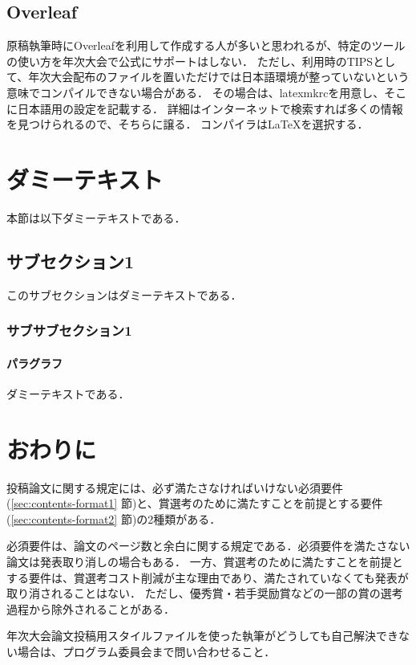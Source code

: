 \documentclass[
  platex, dvipdfmx,  %
]{nlp2021}
\begin{document}
\subsection{Overleaf}
原稿執筆時にOverleafを利用して作成する人が多いと思われるが、特定のツールの使い方を年次大会で公式にサポートはしない．
ただし、利用時のTIPSとして、年次大会配布のファイルを置いただけでは日本語環境が整っていないという意味でコンパイルできない場合がある．
その場合は、latexmkrcを用意し、そこに日本語用の設定を記載する．
詳細はインターネットで検索すれば多くの情報を見つけられるので、そちらに譲る．
コンパイラはLaTeXを選択する．

\section{ダミーテキスト}
本節は以下ダミーテキストである．

\subsection{サブセクション1}
このサブセクションはダミーテキストである．

\subsubsection{サブサブセクション1}

\paragraph{パラグラフ}
ダミーテキストである．

\section{おわりに}
投稿論文に関する規定には、必ず満たさなければいけない必須要件(\ref{sec:contents-format1}
節)と、賞選考のために満たすことを前提とする要件(\ref{sec:contents-format2}
節)の2種類がある．

必須要件は、論文のページ数と余白に関する規定である．必須要件を満たさない論文は発表取り消しの場合もある．
一方、賞選考のために満たすことを前提とする要件は、賞選考コスト削減が主な理由であり、満たされていなくても発表が取り消されることはない．
ただし、優秀賞・若手奨励賞などの一部の賞の選考過程から除外されることがある．

年次大会論文投稿用スタイルファイルを使った執筆がどうしても自己解決できない場合は、プログラム委員会まで問い合わせること．

\end{document}
